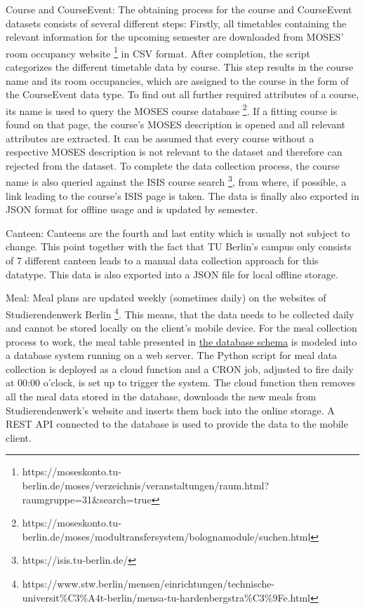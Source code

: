 Course and CourseEvent: The obtaining process for the course and CourseEvent datasets consists of several different steps: Firstly, all timetables containing the relevant information for the upcoming semester are downloaded from MOSES' room occupancy website \footnote{https://moseskonto.tu-berlin.de/moses/verzeichnis/veranstaltungen/raum.html?raumgruppe=31\&search=true} in CSV format. After completion, the script categorizes the different timetable data by course. This step results in the course name and its room occupancies, which are assigned to the course in the form of the CourseEvent data type. To find out all further required attributes of a course, its name is used to query the MOSES course database \footnote{https://moseskonto.tu-berlin.de/moses/modultransfersystem/bolognamodule/suchen.html}. If a fitting course is found on that page, the course's MOSES description is opened and all relevant attributes are extracted. It can be assumed that every course without a respective MOSES description is not relevant to the dataset and therefore can rejected from the dataset. To complete the data collection process, the course name is also queried against the ISIS course search \footnote{https://isis.tu-berlin.de/}, from where, if possible, a link leading to the course's ISIS page is taken. The data is finally also exported in JSON format for offline usage and is updated by semester.

Canteen: Canteens are the fourth and last entity which is usually not subject to change. This point together with the fact that TU Berlin's campus only consists of 7 different canteen leads to a manual data collection approach for this datatype. This data is also exported into a JSON file for local offline storage.

Meal: Meal plans are updated weekly (sometimes daily) on the websites of Studierendenwerk Berlin \footnote{https://www.stw.berlin/mensen/einrichtungen/technische-universit\%C3\%A4t-berlin/mensa-tu-hardenbergstra\%C3\%9Fe.html}. This means, that the data needs to be collected daily and cannot be stored locally on the client's mobile device. For the meal collection process to work, the meal table presented in \hyperref[fig:database_schema]{the database schema} is modeled into a database system running on a web server. The Python script for meal data collection is deployed as a cloud function and a CRON job, adjusted to fire daily at 00:00 o'clock, is set up to trigger the system. The cloud function then removes all the meal data stored in the database, downloads the new meals from Studierendenwerk's website and inserts them back into the online storage. A REST API connected to the database is used to provide the data to the mobile client.

